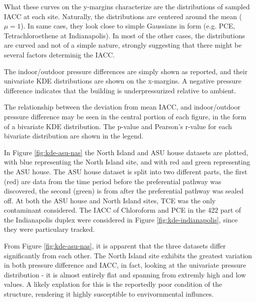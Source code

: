 \documentclass[journal=esthag,manuscript=article]{achemso}
\begin{document}
What these curves on the y-margins characterize are the distributions of sampled IACC at each site.
Naturally, the distributions are centered around the mean ($\mu = 1$).
In same caes, they look close to simple Gaussians in form (e.g. PCE, Tetrachloroethene at Indianapolis).
In most of the other cases, the distributions are curved and not of a simple nature, strongly suggesting that there might be several factors determinig the IACC. \par

The indoor/outdoor pressure differences are simply shown as reported, and their univariate KDE distributions are shown on the x-margins.
A negative pressure difference indicates that the building is underpressurized relative to ambient.\par
The relationship between the deviation from mean IACC, and indoor/outdoor pressure difference may be seen in the central portion of each figure, in the form of a bivariate KDE distribution.
The p-value and Pearson's r-value for each bivariate distribution are shown in the legend.\par
In Figure \ref{fig:kde-asu-nas} the North Island and ASU house datasets are plotted, with blue representing the North Island site, and with red and green representing the ASU house.
The ASU house dataset is split into two different parts, the first (red) are data from the time period before the preferential pathway was discovered, the second (green) is from after the preferential pathway was sealed off.
At both the ASU house and North Island sites, TCE was the only contaminant considered.
The IACC of Chloroform and PCE in the 422 part of the Indianapolis duplex were considered in Figure \ref{fig:kde-indianapolis}, since they were particulary tracked.\par
From Figure \ref{fig:kde-asu-nas}, it is apparent that the three datasets differ significantly from each other.
The North Island site exhibits the greatest variation in both pressure difference and IACC, in fact, looking at the univariate pressure distribution - it is almost entirely flat and spanning from extremly high and low values.
A likely explation for this is the reportedly poor condition of the structure, rendering it highly susceptible to envivornmental influnces.\par
\end{document}
